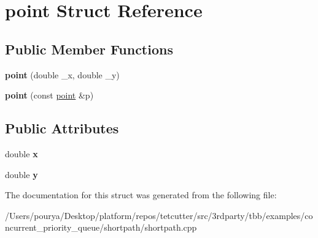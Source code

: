 \hypertarget{structpoint}{}\section{point Struct Reference}
\label{structpoint}
\subsection*{Public Member Functions}
\begin{DoxyCompactItemize}
\item 
\hypertarget{structpoint_ac6ce7bc3fdd4c74767552b8f8afc37a0}{}{\bfseries point} (double \+\_\+x, double \+\_\+y)\label{structpoint_ac6ce7bc3fdd4c74767552b8f8afc37a0}

\item 
\hypertarget{structpoint_a9abff873a8231836600f4d330cc5a042}{}{\bfseries point} (const \hyperlink{structpoint}{point} \&p)\label{structpoint_a9abff873a8231836600f4d330cc5a042}

\end{DoxyCompactItemize}
\subsection*{Public Attributes}
\begin{DoxyCompactItemize}
\item 
\hypertarget{structpoint_a9c6b34deaf4900ad4193c17935fd384a}{}double {\bfseries x}\label{structpoint_a9c6b34deaf4900ad4193c17935fd384a}

\item 
\hypertarget{structpoint_a613f8f0d7352731638b0094e1b958b87}{}double {\bfseries y}\label{structpoint_a613f8f0d7352731638b0094e1b958b87}

\end{DoxyCompactItemize}


The documentation for this struct was generated from the following file\+:\begin{DoxyCompactItemize}
\item 
/\+Users/pourya/\+Desktop/platform/repos/tetcutter/src/3rdparty/tbb/examples/concurrent\+\_\+priority\+\_\+queue/shortpath/shortpath.\+cpp\end{DoxyCompactItemize}
